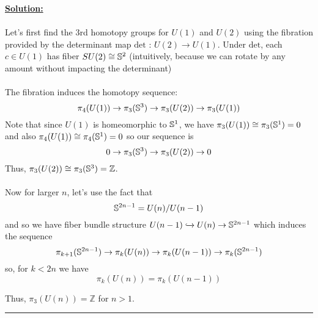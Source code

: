 \documentclass[11pt]{article}
\begin{document}
\vskip 0.5cm
\textbf{\underline{Solution:}}
\\
\\
Let's first find the 3rd homotopy groups for $U(1)$ and $U(2)$ using the fibration provided by the determinant map $\mathrm{det} \text{ : } U(2) \rightarrow U(1)$. Under $\mathrm{det}$, each $c \in U(1)$ has fiber $SU(2) \cong \mathbb{S}^2$ (intuitively, because we can rotate by any amount without impacting the determinant)
\\
\\
The fibration induces the homotopy sequence:
$$ \pi_4(U(1)) \rightarrow \pi_3(\mathbb{S}^3) \rightarrow \pi_3(U(2)) \rightarrow \pi_3(U(1)) $$
Note that since $U(1)$ is homeomorphic to $\mathbb{S}^1$, we have $\pi_3(U(1)) \cong \pi_3(\mathbb{S}^1) = 0$ and also $\pi_4(U(1)) \cong \pi_4(\mathbb{S}^1) = 0$ so our sequence is 
$$ 0 \rightarrow \pi_3(\mathbb{S}^3) \rightarrow \pi_3(U(2)) \rightarrow 0 $$ Thus, $\pi_3(U(2)) \cong \pi_3(\mathbb{S}^3) = \mathbb{Z}$.
\\
\\
Now for larger $n$, let's use the fact that $$ \mathbb{S}^{2n-1} = U(n)/U(n-1) $$ and so we have fiber bundle structure $U(n-1) \xhookrightarrow{} U(n) \rightarrow \mathbb{S}^{2n-1} $ which induces the sequence 
$$  \pi_{k+1}(\mathbb{S}^{2n-1}) \rightarrow \pi_k(U(n)) \rightarrow  \pi_k(U(n-1)) \rightarrow \pi_{k}(\mathbb{S}^{2n-1}) $$ so, for $k < 2n$ we have $$ \pi_k(U(n)) = \pi_k(U(n-1)) $$

Thus, $\pi_3(U(n)) = \mathbb{Z}$ for $n > 1$.

\vskip 0.5cm
\hrule
\pagebreak



















% 
\end{document}

